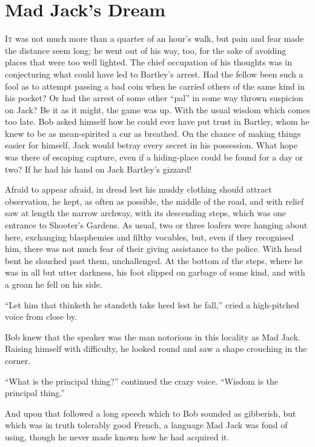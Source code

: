 \chapter{Mad Jack's Dream}

\textsc{It} was not much more than a quarter of an hour's walk, but pain
and fear made the distance seem long; he went out of his way, too, for
the sake of avoiding places that were too well lighted. The chief
occupation of his thoughts was in conjecturing what could have led to
Bartley's arrest. Had the fellow been such a fool as to attempt passing
a bad coin when he carried others of the same kind in his pocket? Or had
the arrest of some other ``pal'' in some way thrown suspicion on Jack?
Be it as it might, the game was up. With the usual wisdom which comes
too late. Bob asked himself how he could ever have put trust in Bartley,
whom he knew to be as mean-spirited a cur as breathed. On the chance of
making things easier for himself, Jack would betray every secret in his
possession. What hope {}was there of escaping capture, even if a
hiding-place could be found for a day or two? If he had his hand on Jack
Bartley's gizzard!

Afraid to appear afraid, in dread lest his muddy clothing should attract
observation, he kept, as often as possible, the middle of the road, and
with relief saw at length the narrow archway, with its descending steps,
which was one entrance to Shooter's Gardens. As usual, two or three
loafers were hanging about here, exchanging blasphemies and filthy
vocables, but, even if they recognised him, there was not much fear of
their giving assistance to the police. With head bent he slouched past
them, unchallenged. At the bottom of the steps, where he was in all but
utter darkness, his foot slipped on garbage of some kind, and with a
groan he fell on his side.

``Let him that thinketh he standeth take heed lest he fall,'' cried a
high-pitched voice from close by.

Bob knew that the speaker was the man notorious in this locality as Mad
Jack. Raising himself with difficulty, he looked round and saw a shape
crouching in the corner.

``What is the principal thing?'' continued {}the crazy voice. ``Wisdom
is the principal thing.''

And upon that followed a long speech which to Bob sounded as gibberish,
but which was in truth tolerably good French, a language Mad Jack was
fond of using, though he never made known how he had acquired it.

